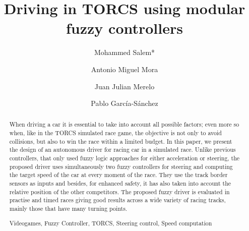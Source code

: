 \documentclass[runningheads,a4paper]{llncs}
\newcommand{\keywords}[1]{\par\addvspace\baselineskip
	\noindent\keywordname\enspace\ignorespaces#1}
\begin{document}
	
	\mainmatter  %
	
	\title{Driving in TORCS using modular fuzzy controllers}
	
	
	
	
	
	
	\author{Mohammed Salem*  \and Antonio Miguel Mora \and Juan Julian Merelo  \and Pablo Garc\'ia-S\'anchez }
	
	
	
	
	
	
	\tocauthor{}
	\maketitle
	\begin{abstract}
		
		When driving a car it is essential to take into account all possible
		factors; even more so when, like in the TORCS simulated race game, the
		objective is not only to avoid collisions, but also to win the race
		within a limited budget. In this paper, we present the design of an autonomous
		driver for racing car in a simulated race. Unlike previous controllers, that only used fuzzy logic approaches for either acceleration or steering, the proposed driver uses simultaneously two fuzzy controllers for steering and computing the target speed of the car at every moment of the race. They use the track border sensors as inputs and besides, for enhanced safety, it has also taken into account the relative position of the other competitors.
		The proposed fuzzy driver is evaluated in practise and timed races
		giving good results across a wide variety of racing tracks, mainly
		those that have many turning points.  
		
		\keywords{Videogames, Fuzzy Controller, TORCS, Steering control, Speed computation}
	\end{abstract}
	
\end{document}
